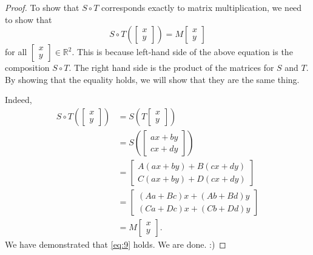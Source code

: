 \documentclass[10pt]{article}
\theoremstyle{definition}
\newcommand{\R}{\mathbb{R}}           %
\begin{document}
\begin{proof}
  To show that $S\circ T$ corresponds exactly to matrix multiplication, we
  need to show that
  \begin{equation}\label{eq:9}
    S\circ T \left(
      \begin{bmatrix}
      x\\y
    \end{bmatrix}
  \right) 
     =
    M
    \begin{bmatrix}
      x\\y
    \end{bmatrix}
  \end{equation}
  for all $
  \begin{bmatrix}
    x\\y
  \end{bmatrix}\in \R^{2}.
  $
  This is because left-hand side of the above equation is the composition $S\circ T$. The
  right hand side is the product of the matrices for $S$ and $T$. By showing
  that the equality holds, we will show that they are the same thing.
  
  Indeed, 
  \begin{align*}
    S\circ T \left(
    \begin{bmatrix}
      x\\y
    \end{bmatrix}
    \right)
    &=
    S \left( T
    \begin{bmatrix}
      x\\y
    \end{bmatrix}
    \right)\\
    &=S \left(
      \begin{bmatrix}
        ax+by\\cx+dy
      \end{bmatrix}
    \right)\\ 
    &=
      \begin{bmatrix}
        A(ax+by)+B(cx+dy)\\
        C(ax+by)+D(cx+dy)
      \end{bmatrix}\\
    &=
      \begin{bmatrix}
        (Aa+Bc)x+(Ab+Bd)y\\
        (Ca+Dc)x+(Cb+Dd)y
      \end{bmatrix}\\
    &= M
      \begin{bmatrix}
        x\\y
      \end{bmatrix}.
  \end{align*}
  We have demonstrated that \cref{eq:9} holds. We are done. :)
\end{proof}
\newpage
\end{document}
